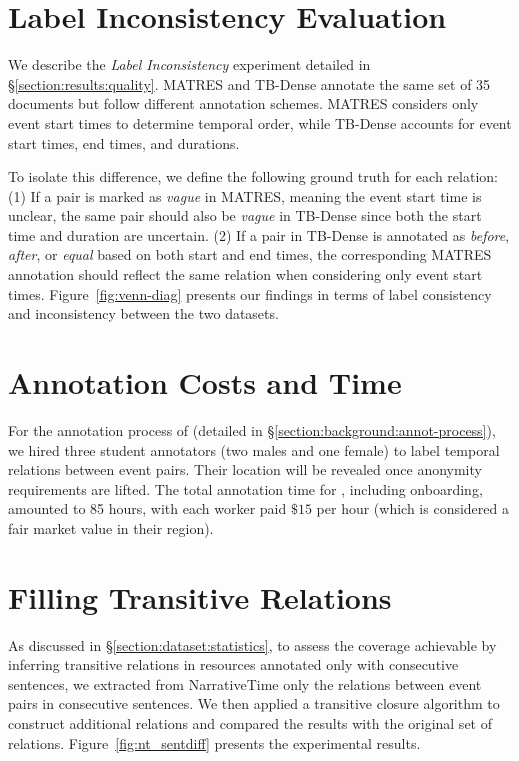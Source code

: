 




\section{Label Inconsistency Evaluation}
\label{appx:consist-eval}
We describe the \textit{Label Inconsistency} experiment detailed in §\ref{section:results:quality}. MATRES \cite{ning-etal-2018-multi} and TB-Dense \cite{chambers-etal-2014-dense} annotate the same set of 35 documents but follow different annotation schemes. MATRES considers only event start times to determine temporal order, while TB-Dense accounts for event start times, end times, and durations.

To isolate this difference, we define the following ground truth for each relation: (1) If a pair is marked as \textit{vague} in MATRES, meaning the event start time is unclear, the same pair should also be \textit{vague} in TB-Dense since both the start time and duration are uncertain. (2) If a pair in TB-Dense is annotated as \textit{before}, \textit{after}, or \textit{equal} based on both start and end times, the corresponding MATRES annotation should reflect the same relation when considering only event start times. Figure~\ref{fig:venn-diag} presents our findings in terms of label consistency and inconsistency between the two datasets.


\section{Annotation Costs and Time}
\label{appx:annot-costs}
For the annotation process of \App{} (detailed in §\ref{section:background:annot-process}), we hired three student annotators (two males and one female) to label temporal relations between event pairs.
Their location will be revealed once anonymity requirements are lifted.
The total annotation time for \App{}, including onboarding, amounted to 85 hours, with each worker paid $\$15$ per hour (which is considered a fair market value in their region). %


\section{Filling Transitive Relations}
\label{appx:trans-rels}
As discussed in §\ref{section:dataset:statistics}, to assess the coverage achievable by inferring transitive relations in resources annotated only with consecutive sentences, we extracted from NarrativeTime only the relations between event pairs in consecutive sentences. We then applied a transitive closure algorithm \cite{warsheall-1962} to construct additional relations and compared the results with the original set of relations. Figure~\ref{fig:nt_sentdiff} presents the experimental results.



